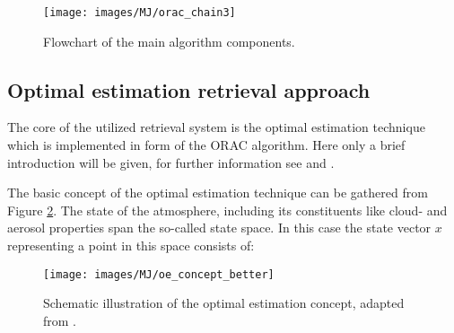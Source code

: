 \documentclass[amt]{style/copernicus}
\begin{document}

\begin{figure}[t]
\vspace*{2mm}
\begin{center}
\texttt{[image: images/MJ/orac\_chain3]}
\end{center}
\caption{Flowchart of the main algorithm components.}\label{chainfigure}
\end{figure}



\subsection{Optimal estimation retrieval approach}\label{oedetails}


The core of the utilized retrieval system is the optimal estimation technique which is implemented in form of the ORAC algorithm. Here only a brief introduction will be given, for further information see \citet{Poulsen12} and \citet{Rodgers09}.

The basic concept of the optimal estimation technique can be gathered from Figure \ref{oefigure}. The state of the atmosphere, including its constituents like cloud- and aerosol properties span the so-called state space. In this case the state vector $x$ representing a point in this space consists of:

\begin{figure}[t]
\vspace*{2mm}
\begin{center}
\texttt{[image: images/MJ/oe\_concept\_better]}
\end{center}
\caption{Schematic illustration of the optimal estimation concept, adapted from \citet{Rodgers09}.}\label{oefigure}
\end{figure}
\end{document}
